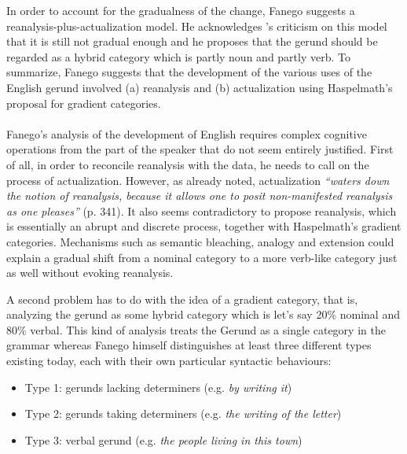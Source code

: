 In order to account for the gradualness of the change, Fanego suggests a reanalysis-plus-actualization model. He acknowledges \citet{haspelmath98does}'s criticism on this model that it is still not gradual enough and he proposes that the gerund should be regarded as a hybrid category which is partly noun and partly verb. To summarize, Fanego suggests that the development of the various uses of the English gerund involved (a) reanalysis and (b) actualization using Haspelmath's proposal for gradient categories. 
\\
\\
 Fanego's analysis of the development of English requires complex cognitive operations from the part of the speaker that do not seem entirely justified. First of all, in order to reconcile reanalysis with the data, he needs to call on the process of actualization. However, as \citet{haspelmath98does} already noted, actualization {\em ``waters down the notion of reanalysis, because it allows one to posit non-manifested reanalysis as one pleases''} (p. 341). It also seems contradictory to propose reanalysis, which is essentially an abrupt and discrete process, together with Haspelmath's gradient categories. Mechanisms such as semantic bleaching, analogy and extension could explain a gradual shift from a nominal category to a more verb-like category just as well without evoking reanalysis.

A second problem has to do with the idea of a gradient category, that is, analyzing the gerund as some hybrid category which is let's say 20\% nominal and 80\% verbal. This kind of analysis treats the Gerund as a single category in the grammar whereas Fanego himself distinguishes at least three different types existing today, each with their own particular syntactic behaviours:

\begin{itemize}
\item Type 1: gerunds lacking determiners (e.g. {\em by writing it})
\item Type 2: gerunds taking determiners (e.g. {\em the writing of the letter})
\item Type 3: verbal gerund (e.g. {\em the people living in this town})
\end{itemize}

